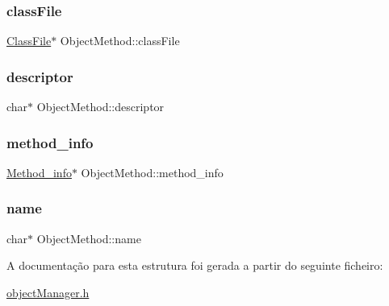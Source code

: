\subsubsection{\texorpdfstring{class\+File}{classFile}}
{\footnotesize\ttfamily \hyperlink{struct_class_file}{Class\+File}$\ast$ Object\+Method\+::class\+File}

\hypertarget{struct_object_method_ae7d442f2fdbcdf5968d32df65c61d0e2}{}\label{struct_object_method_ae7d442f2fdbcdf5968d32df65c61d0e2} 
\subsubsection{\texorpdfstring{descriptor}{descriptor}}
{\footnotesize\ttfamily char$\ast$ Object\+Method\+::descriptor}

\hypertarget{struct_object_method_a63acf8290f2ab0e103f87171a4866ca2}{}\label{struct_object_method_a63acf8290f2ab0e103f87171a4866ca2} 
\subsubsection{\texorpdfstring{method\+\_\+info}{method\_info}}
{\footnotesize\ttfamily \hyperlink{struct_method__info}{Method\+\_\+info}$\ast$ Object\+Method\+::method\+\_\+info}

\hypertarget{struct_object_method_a4e8b8c4a58edfdc9331eec931905e8c1}{}\label{struct_object_method_a4e8b8c4a58edfdc9331eec931905e8c1} 
\subsubsection{\texorpdfstring{name}{name}}
{\footnotesize\ttfamily char$\ast$ Object\+Method\+::name}



A documentação para esta estrutura foi gerada a partir do seguinte ficheiro\+:\begin{DoxyCompactItemize}
\item 
\hyperlink{object_manager_8h}{object\+Manager.\+h}\end{DoxyCompactItemize}
